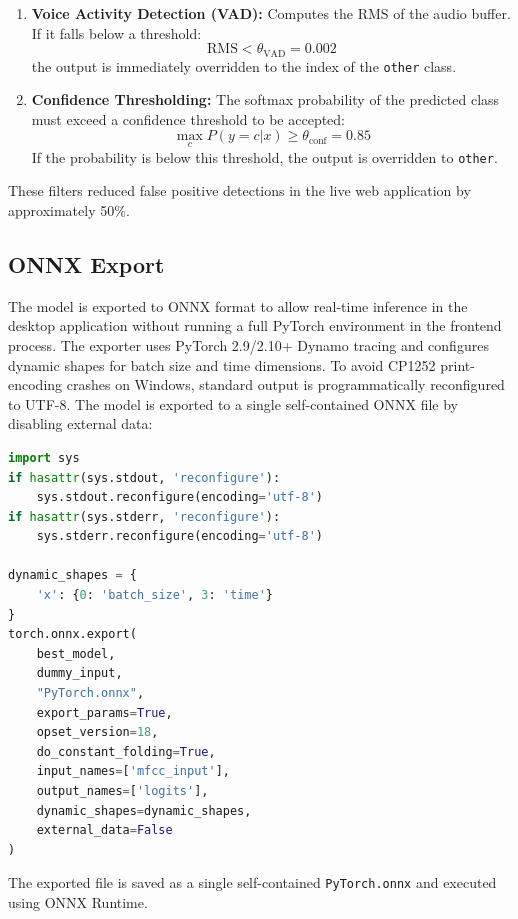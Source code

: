 \begin{enumerate}
    \item \textbf{Voice Activity Detection (VAD):} Computes the RMS of the audio buffer. If it falls below a threshold:
    \begin{equation}
        \text{RMS} < \theta_{\text{VAD}} = 0.002
    \end{equation}
    the output is immediately overridden to the index of the \texttt{other} class.
    \item \textbf{Confidence Thresholding:} The softmax probability of the predicted class must exceed a confidence threshold to be accepted:
    \begin{equation}
        \max_c P(y=c|x) \ge \theta_{\text{conf}} = 0.85
    \end{equation}
    If the probability is below this threshold, the output is overridden to \texttt{other}.
\end{enumerate}

These filters reduced false positive detections in the live web application by approximately 50\%.

\subsection{ONNX Export}
The model is exported to ONNX format to allow real-time inference in the desktop application without running a full PyTorch environment in the frontend process. The exporter uses PyTorch 2.9/2.10+ Dynamo tracing and configures dynamic shapes for batch size and time dimensions. To avoid CP1252 print-encoding crashes on Windows, standard output is programmatically reconfigured to UTF-8. The model is exported to a single self-contained ONNX file by disabling external data:
\begin{lstlisting}[language=Python, caption={ONNX Export Script}]
import sys
if hasattr(sys.stdout, 'reconfigure'):
    sys.stdout.reconfigure(encoding='utf-8')
if hasattr(sys.stderr, 'reconfigure'):
    sys.stderr.reconfigure(encoding='utf-8')

dynamic_shapes = {
    'x': {0: 'batch_size', 3: 'time'}
}
torch.onnx.export(
    best_model,
    dummy_input,
    "PyTorch.onnx",
    export_params=True,
    opset_version=18,
    do_constant_folding=True,
    input_names=['mfcc_input'],
    output_names=['logits'],
    dynamic_shapes=dynamic_shapes,
    external_data=False
)
\end{lstlisting}
The exported file is saved as a single self-contained \texttt{PyTorch.onnx} and executed using ONNX Runtime.

